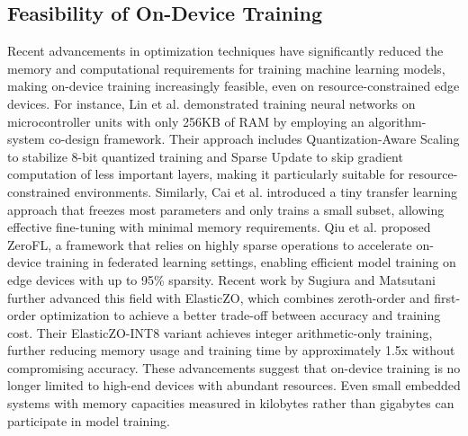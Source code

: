 \subsection{Feasibility of On-Device Training}

Recent advancements in optimization techniques have significantly reduced the memory and computational requirements for training machine learning models, making on-device training increasingly feasible, even on resource-constrained edge devices.
For instance, Lin et al. \cite{lin2022ondevice} demonstrated training neural networks on microcontroller units with only 256KB of RAM by employing an algorithm-system co-design framework. Their approach includes Quantization-Aware Scaling to stabilize 8-bit quantized training and Sparse Update to skip gradient computation of less important layers, making it particularly suitable for resource-constrained environments.
Similarly, Cai et al. \cite{cai2020tinytl} introduced a tiny transfer learning approach that freezes most parameters and only trains a small subset, allowing effective fine-tuning with minimal memory requirements. Qiu et al. \cite{qiu2022zerofl} proposed ZeroFL, a framework that relies on highly sparse operations to accelerate on-device training in federated learning settings, enabling efficient model training on edge devices with up to 95\% sparsity.
Recent work by Sugiura and Matsutani \cite{sugiura2025elasticzo} further advanced this field with ElasticZO, which combines zeroth-order and first-order optimization to achieve a better trade-off between accuracy and training cost. Their ElasticZO-INT8 variant achieves integer arithmetic-only training, further reducing memory usage and training time by approximately 1.5x without compromising accuracy.
These advancements suggest that on-device training is no longer limited to high-end devices with abundant resources. Even small embedded systems with memory capacities measured in kilobytes rather than gigabytes can participate in model training.
